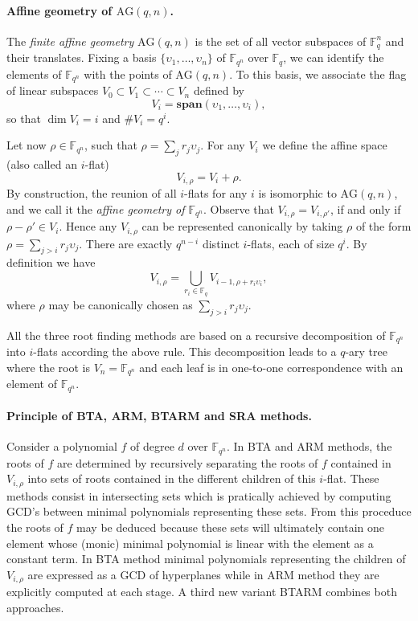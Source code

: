 \documentclass{article}
\newcommand{\ff}[1]{\mathbb{F}_{#1}}
\newcommand{\dd}{d}
\newcommand{\qq}{q}
\newcommand{\nn}{n}
\newcommand{\qn}{{\qq^\nn}}
\newcommand{\basef}{\ff{\qq}}
\newcommand{\extf}{\ff{\qn}}
\newcommand{\AG}{\mathrm{AG}(\qq,\nn)}
\newcommand{\Span}{\mathbf{span}}
\newcommand{\card}[1]{\# #1}
\begin{document}
\paragraph{Affine geometry of $\AG$.} The \emph{finite affine geometry} $\AG$ is the set of all vector subspaces of $\basef^\nn$ and their translates. Fixing a basis $\{\upsilon_1,\ldots,\upsilon_\nn\}$ of $\extf$ over $\basef$, we can
identify the elements of $\extf$ with the points of $\AG$. To this basis, we associate the flag of linear
subspaces $V_0\subset V_1\subset \cdots \subset V_\nn$ defined by
\begin{equation}
  V_i = \Span(\upsilon_1,\dots,\upsilon_i),
\end{equation}
so that $\dim V_i = i$ and $\card V_i = \qq^i$.

Let now $\rho\in\extf$, such that $\rho=\sum_j r_j\upsilon_j$.  For any
$V_i$ we define the affine space (also called an $i$-flat)
\begin{equation}
  V_{i,\rho} = V_i + \rho.
\end{equation}
By construction, the reunion of all $i$-flats for any $i$ is
isomorphic to $\AG$, and we call it the \emph{affine geometry of
  $\extf$}.
Observe that $V_{i,\rho}=V_{i,\rho'}$, if and only if $\rho-\rho'\in V_i$. Hence
any $V_{i,\rho}$ can be represented canonically by taking $\rho$ of
the form $\rho=\sum_{j>i}r_j\upsilon_j$. There are exactly
$\qq^{n-i}$ distinct $i$-flats, each of size $\qq^i$. By definition we have
\begin{equation}
  \label{decomposition-tree-iflats}
  V_{i,\rho} = \bigcup_{r_i \in\basef} V_{i-1,\rho + r_i \upsilon_i},
\end{equation}
where $\rho$ may be canonically chosen as $\sum_{j>i}r_j\upsilon_j$.

\medskip

\noindent All the three root finding methods are based on a recursive decomposition of $\extf$ into $i$-flats 
according the above rule. This decomposition leads to a $\qq$-ary tree where the root 
is $V_{n}=\extf$ and each leaf is in one-to-one correspondence with an element of $\extf$.

\medskip


\paragraph{Principle of BTA, ARM, BTARM and SRA methods.} Consider a polynomial $f$ of degree $\dd$ over $\extf$. In BTA and ARM methods, the roots of $f$ are determined by recursively separating the roots of $f$ contained in $V_{i,\rho}$ into sets of roots contained in the different children of this $i$-flat. These methods consist in intersecting sets which is pratically achieved by computing GCD's between minimal polynomials representing these sets. From this proceduce the roots of $f$ may be deduced because 
these sets will ultimately contain one element whose (monic) minimal polynomial is linear with the element as a constant term. In BTA method minimal polynomials representing the children of $V_{i,\rho}$
are expressed as a GCD of hyperplanes while in ARM method they are explicitly computed at each stage. A third new variant BTARM combines both approaches.
\end{document}
